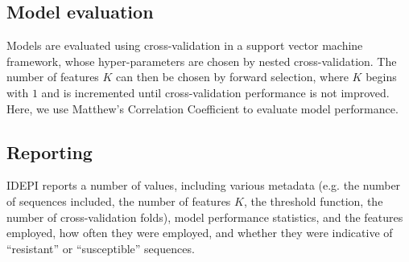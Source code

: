 \documentclass[10pt]{article}
\newcommand{\idepi}{{IDEPI}}
\begin{document}
\subsection*{Model evaluation}
Models are evaluated using cross-validation in a support vector machine framework, whose hyper-parameters are chosen by nested cross-validation. The number of features $K$ can then be chosen by forward selection, where $K$ begins with $1$ and is incremented until cross-validation performance is not improved. Here, we use Matthew's Correlation Coefficient to evaluate model performance.

\subsection*{Reporting}
\idepi{} reports a number of values, including various metadata (e.g. the number of sequences included, the number of features $K$, the threshold function, the number of cross-validation folds), model performance statistics, and the features employed, how often they were employed, and whether they were indicative of ``resistant'' or ``susceptible'' sequences.
\end{document}
